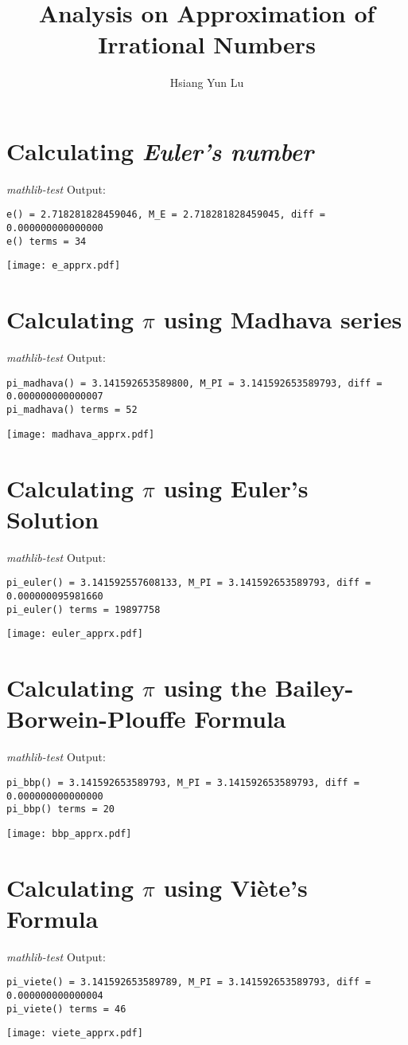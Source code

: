 \documentclass[12pt]{article}
\title{Analysis on Approximation of Irrational Numbers}
\author{Hsiang Yun Lu}
\begin{document}
\maketitle

\section{Calculating \textit{Euler’s number}}

\textit{mathlib-test} Output:
\begin{verbatim}
e() = 2.718281828459046, M_E = 2.718281828459045, diff = 0.000000000000000
e() terms = 34
\end{verbatim}
\texttt{[image: e\_apprx.pdf]}

\section{Calculating $\pi$ using Madhava series}
\textit{mathlib-test} Output:
\begin{verbatim}
pi_madhava() = 3.141592653589800, M_PI = 3.141592653589793, diff = 0.000000000000007
pi_madhava() terms = 52
\end{verbatim}
\texttt{[image: madhava\_apprx.pdf]}

\section{Calculating $\pi$ using Euler’s Solution} 
\textit{mathlib-test} Output:
\begin{verbatim}
pi_euler() = 3.141592557608133, M_PI = 3.141592653589793, diff = 0.000000095981660
pi_euler() terms = 19897758
\end{verbatim}
\texttt{[image: euler\_apprx.pdf]}

\section{Calculating $\pi$ using the Bailey-Borwein-Plouffe Formula}
\textit{mathlib-test} Output:
\begin{verbatim}
pi_bbp() = 3.141592653589793, M_PI = 3.141592653589793, diff = 0.000000000000000
pi_bbp() terms = 20
\end{verbatim}
\texttt{[image: bbp\_apprx.pdf]}

\section{Calculating $\pi$ using Viète’s Formula}
\textit{mathlib-test} Output:
\begin{verbatim}
pi_viete() = 3.141592653589789, M_PI = 3.141592653589793, diff = 0.000000000000004
pi_viete() terms = 46
\end{verbatim}
\texttt{[image: viete\_apprx.pdf]}
\end{document}
